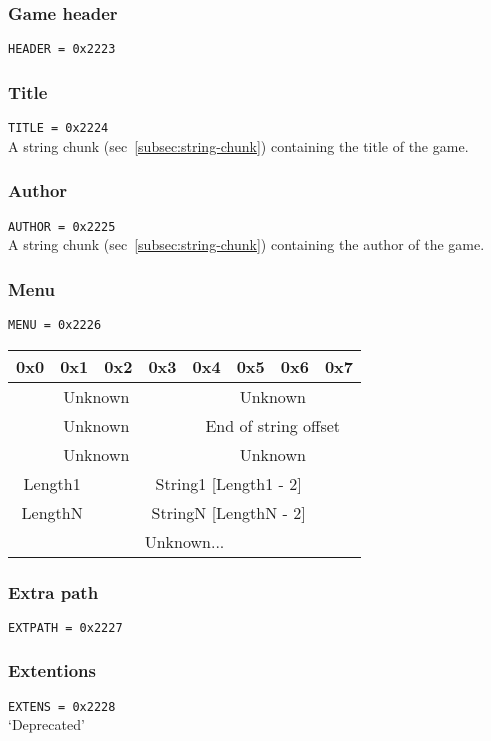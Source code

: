 \documentclass{article}
\begin{document}
\subsubsection{Game header}
\verb|HEADER = 0x2223|

\subsubsection{Title}
\verb|TITLE = 0x2224|
\\
A string chunk (sec~\ref{subsec:string-chunk}) containing the title of the
game.

\subsubsection{Author}
\verb|AUTHOR = 0x2225|
\\
A string chunk (sec~\ref{subsec:string-chunk}) containing the author of the
game.

\subsubsection{Menu}
\verb|MENU = 0x2226|
\\
\begin{tabular}{c|c|c|c|c|c|c|c}
  0x0 & 0x1 & 0x2 & 0x3 & 0x4 & 0x5 & 0x6 & 0x7
  \\ \hline
  \multicolumn{4}{|c|}{Unknown} &
  \multicolumn{4}{|c|}{Unknown}
  \\ \hline
  \multicolumn{4}{|c|}{Unknown} &
  \multicolumn{4}{|c|}{End of string offset}
  \\ \hline
  \multicolumn{4}{|c|}{Unknown} &
  \multicolumn{4}{|c|}{Unknown}
  \\ \hline
  \multicolumn{2}{|c|}{Length1} &
  \multicolumn{6}{|c}{String1 [Length1 - 2]}
  \\ \hline \hline
  \multicolumn{2}{|c|}{LengthN} &
  \multicolumn{6}{|c}{StringN [LengthN - 2]}
  \\ \hline
  \multicolumn{8}{|c}{Unknown...}
  \\ \hline
\end{tabular}

\subsubsection{Extra path}
\verb|EXTPATH = 0x2227|

\subsubsection{Extentions}
\verb|EXTENS = 0x2228|
\\
`Deprecated'
\end{document}
